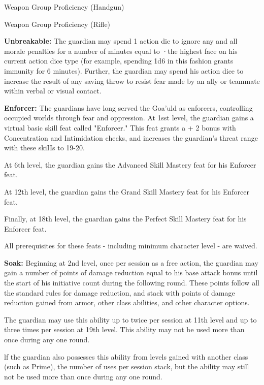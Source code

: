 Weapon Group Proficiency (Handgun)

Weapon Group Proficiency (Rifle)

\textbf{Unbreakable:} The guardian may spend 1 action die to ignore any and all morale penalties for a number of minutes equal to ·the highest face on his current action dice type (for example, spending 1d6 in this fashion grants immunity for 6 minutes).
Further, the guardian may spend his action dice to increase the result of any saving throw to resist fear made by an ally or teammate within verbal or visual contact.

\vspace*{5pt}

\textbf{Enforcer:} The guardians have long served the Goa'uld as enforcers, controlling occupied worlds through fear and oppression. At 1sst level, the guardian gains a virtual basic skill feat called "Enforcer." This feat grants a + 2 bonus with Concentration and Intimidation checks, and increases the guardian's threat range with these skiIIs to 19-20.

At 6th level, the guardian gains the Advanced Skill Mastery feat for his Enforcer feat.

At 12th level, the guardian gains the Grand Skill Mastery feat for his Enforcer feat.

Finally, at 18th level, the guardian gains the Perfect Skill Mastery feat for his Enforcer feat.

All prerequisites for these feats - including minimum character level - are waived.

\textbf{Soak:} Beginning at 2nd level, once per session as a free action, the guardian may gain a number of points of damage reduction equal to his base attack bonus until the start of his initiative count during the following round. These points follow all the standard rules for damage reduction, and stack with points of damage reduction gained from armor, other class abilities, and other character options.

The guardian may use this ability up to twice per session at 11th level and up to three times per session at 19th level. This ability may not be used more than once during any one round.

lf the guardian also possesses this ability from levels gained with another class (such as Prime), the number of uses per session stack, but the ability may still not be used more than once during any one round.


